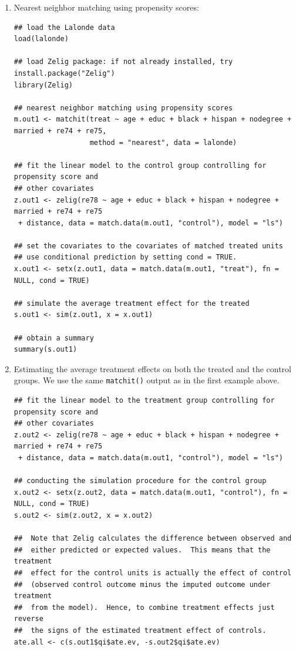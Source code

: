 \documentclass[oneside,letterpaper,titlepage]{article}
\begin{document}
\begin{enumerate}
\item Nearest neighbor matching using propensity scores: 
\begin{verbatim}
## load the Lalonde data
load(lalonde)

## load Zelig package: if not already installed, try install.package("Zelig")
library(Zelig)

## nearest neighbor matching using propensity scores
m.out1 <- matchit(treat ~ age + educ + black + hispan + nodegree + married + re74 + re75, 
                  method = "nearest", data = lalonde)

## fit the linear model to the control group controlling for propensity score and 
## other covariates
z.out1 <- zelig(re78 ~ age + educ + black + hispan + nodegree + married + re74 + re75
 + distance, data = match.data(m.out1, "control"), model = "ls")

## set the covariates to the covariates of matched treated units
## use conditional prediction by setting cond = TRUE.
x.out1 <- setx(z.out1, data = match.data(m.out1, "treat"), fn = NULL, cond = TRUE)

## simulate the average treatment effect for the treated
s.out1 <- sim(z.out1, x = x.out1)

## obtain a summary
summary(s.out1)
\end{verbatim}
  
\item Estimating the average treatment effects on both the treated and
  the control groups. We use the same {\tt matchit()} output as in the
  first example above.
\begin{verbatim}
## fit the linear model to the treatment group controlling for propensity score and 
## other covariates
z.out2 <- zelig(re78 ~ age + educ + black + hispan + nodegree + married + re74 + re75
 + distance, data = match.data(m.out1, "control"), model = "ls")

## conducting the simulation procedure for the control group
x.out2 <- setx(z.out2, data = match.data(m.out1, "control"), fn = NULL, cond = TRUE)
s.out2 <- sim(z.out2, x = x.out2)

##  Note that Zelig calculates the difference between observed and
##  either predicted or expected values.  This means that the treatment
##  effect for the control units is actually the effect of control
##  (observed control outcome minus the imputed outcome under treatment
##  from the model).  Hence, to combine treatment effects just reverse
##  the signs of the estimated treatment effect of controls.
ate.all <- c(s.out1$qi$ate.ev, -s.out2$qi$ate.ev)


\end{verbatim}
\end{enumerate}
\end{document}
